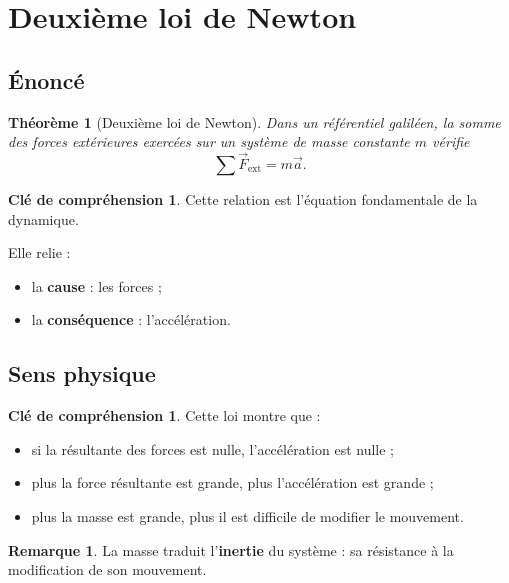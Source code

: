 \documentclass[11pt,a4paper]{article}
\theoremstyle{definition}
\newtheorem{remarque}[definition]{Remarque}
\newtheorem{interpretation}[definition]{Clé de compréhension}
\theoremstyle{plain}
\newtheorem{theoreme}[definition]{Théorème}
\theoremstyle{remark}
\begin{document}
\section{Deuxième loi de Newton}

\subsection{Énoncé}

\begin{theoreme}[Deuxième loi de Newton]
Dans un référentiel galiléen, la somme des forces extérieures exercées sur un système de masse constante $m$ vérifie
\[
\sum \vec{F}_{\text{ext}}=m\vec{a}.
\]
\end{theoreme}

\begin{interpretation}
Cette relation est l'équation fondamentale de la dynamique.

Elle relie :
\begin{itemize}
    \item la \textbf{cause} : les forces ;
    \item la \textbf{conséquence} : l'accélération.
\end{itemize}
\end{interpretation}

\subsection{Sens physique}

\begin{interpretation}
Cette loi montre que :
\begin{itemize}
    \item si la résultante des forces est nulle, l'accélération est nulle ;
    \item plus la force résultante est grande, plus l'accélération est grande ;
    \item plus la masse est grande, plus il est difficile de modifier le mouvement.
\end{itemize}
\end{interpretation}

\begin{remarque}
La masse traduit l'\textbf{inertie} du système : sa résistance à la modification de son mouvement.
\end{remarque}
\end{document}

